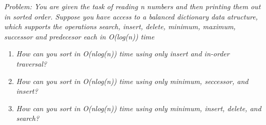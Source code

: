 \emph{Problem: You are given the task of reading n numbers and then printing them out in sorted order. Suppose you have access to a balanced dictionary data atructure, which supports the operations search, insert, delete, minimum, maximum, successor and predecesor each in O(log(n)) time}\\

\begin{enumerate}
	\item \emph{How can you sort in O(nlog(n)) time using only insert and in-order traversal?}
	\item \emph{How can you sort in O(nlog(n)) time using only minimum, seccessor, and insert?}
	\item \emph{How can you sort in O(nlog(n)) time using only minimum, insert, delete, and search?}
\end{enumerate}
